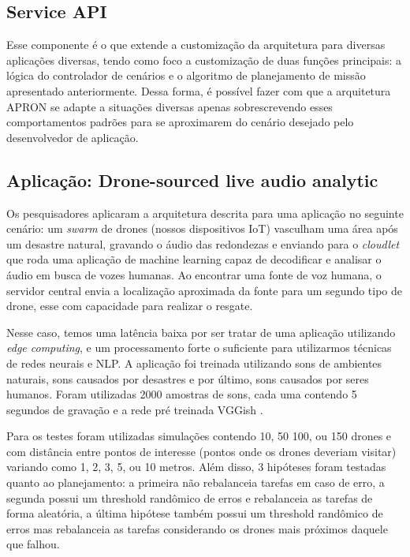 \documentclass[12pt]{article}
\begin{document}
\subsection{Service API}

Esse componente é o que extende a customização da arquitetura para diversas aplicações diversas, tendo como foco a customização de duas funções principais: a lógica do controlador de cenários e o algoritmo de planejamento de missão apresentado anteriormente. Dessa forma, é possível fazer com que a arquitetura APRON se adapte a situações diversas apenas sobrescrevendo esses comportamentos padrões para se aproximarem do cenário desejado pelo desenvolvedor de aplicação.

\subsection{Aplicação: Drone-sourced live audio analytic}

Os pesquisadores aplicaram a arquitetura descrita para uma aplicação no seguinte cenário: um \emph{swarm} de drones (nossos dispositivos IoT) vasculham uma área após um desastre natural, gravando o áudio das redondezas e enviando para o \emph{cloudlet} que roda uma aplicação de machine learning capaz de decodificar e analisar o áudio em busca de vozes humanas. Ao encontrar uma fonte de voz humana, o servidor central envia a localização aproximada da fonte para um segundo tipo de drone, esse com capacidade para realizar o resgate.

Nesse caso, temos uma latência baixa por ser tratar de uma aplicação utilizando \emph{edge computing}, e um processamento forte o suficiente para utilizarmos técnicas de redes neurais e NLP. A aplicação foi treinada utilizando sons de ambientes naturais, sons causados por desastres e por último, sons causados por seres humanos. Foram utilizadas 2000 amostras de sons, cada uma contendo 5 segundos de gravação e a rede pré treinada VGGish \cite{hershey}.

Para os testes foram utilizadas simulações contendo 10, 50 100, ou 150 drones e com distância entre pontos de interesse (pontos onde os drones deveriam visitar) variando como 1, 2, 3, 5, ou 10 metros. Além disso, 3 hipóteses foram testadas quanto ao planejamento: a primeira não rebalanceia tarefas em caso de erro, a segunda possui um threshold randômico de erros e rebalanceia as tarefas de forma aleatória, a última hipótese também possui um threshold randômico de erros mas rebalanceia as tarefas considerando os drones mais próximos daquele que falhou.
\end{document}

